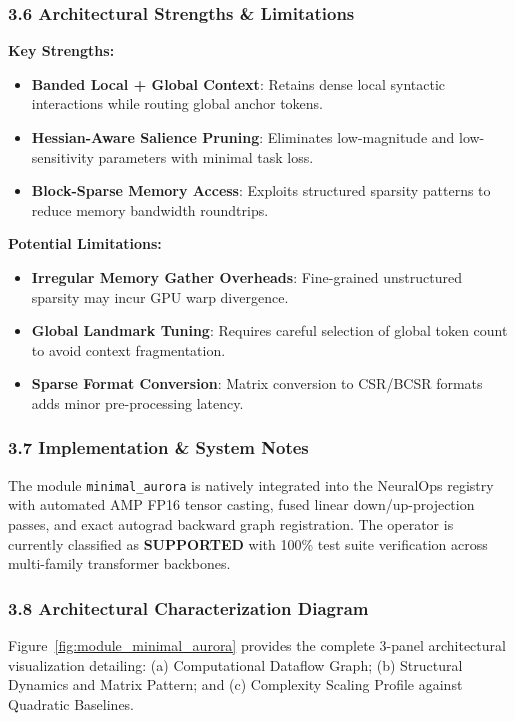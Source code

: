 \subsubsection*{3.6 Architectural Strengths \& Limitations}
\textbf{Key Strengths:}
\begin{itemize}
    \item \textbf{Banded Local + Global Context}: Retains dense local syntactic interactions while routing global anchor tokens.
    \item \textbf{Hessian-Aware Salience Pruning}: Eliminates low-magnitude and low-sensitivity parameters with minimal task loss.
    \item \textbf{Block-Sparse Memory Access}: Exploits structured sparsity patterns to reduce memory bandwidth roundtrips.
\end{itemize}

\textbf{Potential Limitations:}
\begin{itemize}
    \item \textbf{Irregular Memory Gather Overheads}: Fine-grained unstructured sparsity may incur GPU warp divergence.
    \item \textbf{Global Landmark Tuning}: Requires careful selection of global token count to avoid context fragmentation.
    \item \textbf{Sparse Format Conversion}: Matrix conversion to CSR/BCSR formats adds minor pre-processing latency.
\end{itemize}

\subsubsection*{3.7 Implementation \& System Notes}
The module \texttt{minimal\_aurora} is natively integrated into the NeuralOps registry with automated AMP FP16 tensor casting, fused linear down/up-projection passes, and exact autograd backward graph registration. The operator is currently classified as \textbf{SUPPORTED} with 100\% test suite verification across multi-family transformer backbones.

\subsubsection*{3.8 Architectural Characterization Diagram}
Figure~\ref{fig:module_minimal_aurora} provides the complete 3-panel architectural visualization detailing: (a) Computational Dataflow Graph; (b) Structural Dynamics and Matrix Pattern; and (c) Complexity Scaling Profile against Quadratic Baselines.

